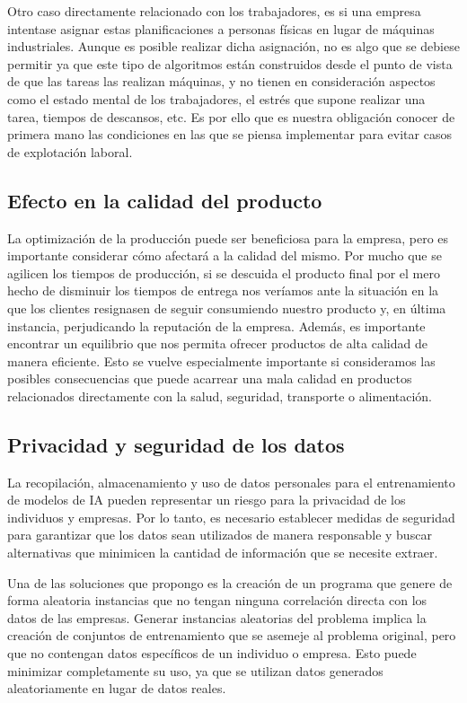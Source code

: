 Otro caso directamente relacionado con los trabajadores, es si una empresa intentase 
asignar estas planificaciones a personas físicas en lugar de máquinas industriales. 
Aunque es posible realizar dicha asignación, no es algo que se debiese permitir ya 
que este tipo de algoritmos están construidos desde el punto de vista de que las 
tareas las realizan máquinas, y no tienen en consideración aspectos como el estado 
mental de los trabajadores, el estrés que supone realizar una tarea, tiempos de 
descansos, etc. Es por ello que es nuestra obligación conocer de primera mano las 
condiciones en las que se piensa implementar para evitar casos de explotación laboral.


\subsection{Efecto en la calidad del producto}
La optimización de la producción puede ser beneficiosa para la empresa, pero es 
importante considerar cómo afectará a la calidad del mismo. Por mucho que se 
agilicen los tiempos de producción, si se descuida el producto final por el mero 
hecho de disminuir los tiempos de entrega nos veríamos ante la situación en la 
que los clientes resignasen de seguir consumiendo nuestro producto y, en última 
instancia, perjudicando la reputación de la empresa. Además, es importante encontrar 
un equilibrio que nos permita ofrecer productos de alta calidad de manera eficiente. 
Esto se vuelve especialmente importante si consideramos las posibles consecuencias 
que puede acarrear una mala calidad en productos relacionados directamente con la 
salud, seguridad, transporte o alimentación.

\subsection{Privacidad y seguridad de los datos}
La recopilación, almacenamiento y uso de datos personales para el entrenamiento de 
modelos de IA pueden representar un riesgo para la privacidad de los individuos y 
empresas. Por lo tanto, es necesario establecer medidas de seguridad para garantizar 
que los datos sean utilizados de manera responsable y buscar alternativas que minimicen 
la cantidad de información que se necesite extraer.\medskip

Una de las soluciones que propongo es la creación de un programa que genere de forma 
aleatoria instancias que no tengan ninguna correlación directa con los datos de las 
empresas. Generar instancias aleatorias del problema implica la creación de conjuntos 
de entrenamiento que se asemeje al problema original, pero que no contengan datos 
específicos de un individuo o empresa. Esto puede minimizar completamente su uso, ya 
que se utilizan datos generados aleatoriamente en lugar de datos reales.\medskip

